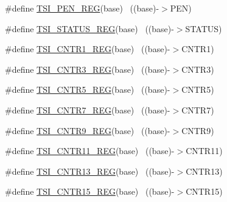 \begin{DoxyCompactItemize}
\item 
\#define \hyperlink{group___t_s_i___register___accessor___macros_gaf538119a9d15bb7ecc599ef0c8dccec8}{T\+S\+I\+\_\+\+P\+E\+N\+\_\+\+R\+EG}(base)                                            ~((base)-\/$>$P\+EN)
\item 
\#define \hyperlink{group___t_s_i___register___accessor___macros_ga7ab95dacdfe4e8d91adaf8783896b212}{T\+S\+I\+\_\+\+S\+T\+A\+T\+U\+S\+\_\+\+R\+EG}(base)                                      ~((base)-\/$>$S\+T\+A\+T\+US)
\item 
\#define \hyperlink{group___t_s_i___register___accessor___macros_ga7c64ae8bd21ec584c53351a1c55b6346}{T\+S\+I\+\_\+\+C\+N\+T\+R1\+\_\+\+R\+EG}(base)                                        ~((base)-\/$>$C\+N\+T\+R1)
\item 
\#define \hyperlink{group___t_s_i___register___accessor___macros_ga1abf4e67869018b5fda8466627fdf6ac}{T\+S\+I\+\_\+\+C\+N\+T\+R3\+\_\+\+R\+EG}(base)                                        ~((base)-\/$>$C\+N\+T\+R3)
\item 
\#define \hyperlink{group___t_s_i___register___accessor___macros_gae18562b4206a5154086131349befffe5}{T\+S\+I\+\_\+\+C\+N\+T\+R5\+\_\+\+R\+EG}(base)                                        ~((base)-\/$>$C\+N\+T\+R5)
\item 
\#define \hyperlink{group___t_s_i___register___accessor___macros_gac1490787aebce3053c85c5742138e611}{T\+S\+I\+\_\+\+C\+N\+T\+R7\+\_\+\+R\+EG}(base)                                        ~((base)-\/$>$C\+N\+T\+R7)
\item 
\#define \hyperlink{group___t_s_i___register___accessor___macros_ga47c15fa313e21645ab38cf808bd08abb}{T\+S\+I\+\_\+\+C\+N\+T\+R9\+\_\+\+R\+EG}(base)                                        ~((base)-\/$>$C\+N\+T\+R9)
\item 
\#define \hyperlink{group___t_s_i___register___accessor___macros_gabb3ec6c9ffd38a29d4917c9c74047087}{T\+S\+I\+\_\+\+C\+N\+T\+R11\+\_\+\+R\+EG}(base)                                      ~((base)-\/$>$C\+N\+T\+R11)
\item 
\#define \hyperlink{group___t_s_i___register___accessor___macros_ga4781f0cae7aee00361b1d6dd24ebb375}{T\+S\+I\+\_\+\+C\+N\+T\+R13\+\_\+\+R\+EG}(base)                                      ~((base)-\/$>$C\+N\+T\+R13)
\item 
\#define \hyperlink{group___t_s_i___register___accessor___macros_ga6999a403171b9b12a3caa9d5c0da77b6}{T\+S\+I\+\_\+\+C\+N\+T\+R15\+\_\+\+R\+EG}(base)                                      ~((base)-\/$>$C\+N\+T\+R15)

\end{DoxyCompactItemize}
